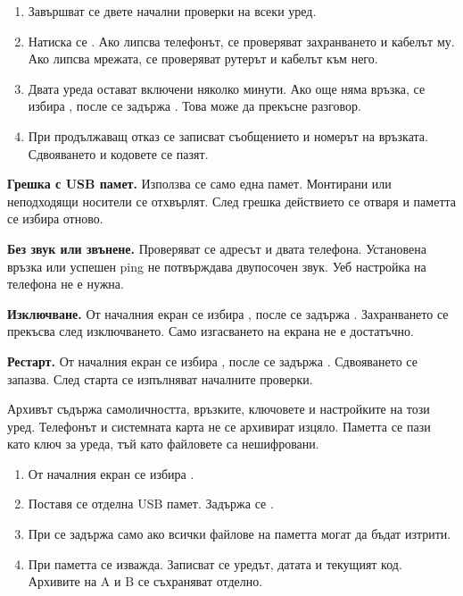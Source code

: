 \begin{enumerate}
\item Завършват се двете начални проверки на всеки уред.
\item Натиска се . Ако липсва телефонът, се проверяват захранването и кабелът му. Ако липсва мрежата, се проверяват рутерът и кабелът към него.
\item Двата уреда остават включени няколко минути. Ако още няма връзка, се избира  \arr {}, после се задържа . Това може да прекъсне разговор.
\item При продължаващ отказ се записват съобщението и номерът на връзката. Сдвояването и кодовете се пазят.
\end{enumerate}

\textbf{Грешка с USB памет.} Използва се само една памет. Монтирани или неподходящи носители се отхвърлят. След грешка действието се отваря и паметта се избира отново.

\textbf{Без звук или звънене.} Проверяват се адресът и двата телефона. Установена връзка или успешен ping не потвърждава двупосочен звук. Уеб настройка на телефона не е нужна.

\textbf{Изключване.} От началния екран се избира , после се задържа . Захранването се прекъсва след изключването. Само изгасването на екрана не е достатъчно.

\textbf{Рестарт.} От началния екран се избира  \arr {}, после се задържа . Сдвояването се запазва. След старта се изпълняват началните проверки.

Архивът съдържа самоличността, връзките, ключовете и настройките на този уред. Телефонът и системната карта не се архивират изцяло. Паметта се пази като ключ за уреда, тъй като файловете са нешифровани.
\begin{enumerate}
\item От началния екран се избира  \arr {} \arr {}.
\item Поставя се отделна USB памет. Задържа се .
\item При  се задържа  само ако всички файлове на паметта могат да бъдат изтрити.
\item При  паметта се изважда. Записват се уредът, датата и текущият код. Архивите на A и B се съхраняват отделно.
\end{enumerate}

